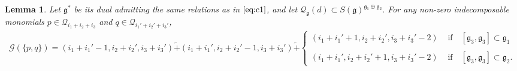 \documentclass[10pt,a4paper]{amsart}
\newtheorem{lemma}{Lemma}
\begin{document}
\begin{lemma}
\label{3.9}
  Let $\mathfrak{g}^*$ be its dual admitting the same relations as in $\eqref{eq:c1}$, and let $\mathcal{Q}_\mathfrak{g}(d) \subset S(\mathfrak{g})^{\mathfrak{g}_1 \oplus \mathfrak{g}_2 }.$ For any non-zero indecomposable monomials $p \in \mathcal{Q}_{i_1 + i_2  + i_3}$ and $q \in \mathcal{Q}_{i_1' + i_2' + i_3'}$,   \begin{align}
  \nonumber
   \mathcal{G} \left(\{p,q\}\right) =     (i_1+i_1'-1,i_2+i_2',i_3+i_3') \tilde{+}(i_1+i_1',i_2+i_2'-1,i_3+i_3') \tilde{+}    \left\{\begin{matrix}
(i_1+i_1'+1,i_2+i_2',i_3+i_3'-2)  & \text{ if } \text{ }  [\mathfrak{g}_3,\mathfrak{g}_3] \subset \mathfrak{g}_1 \\
        \\
         (i_1+i_1',i_2+i_2'+1,i_3+i_3'-2) & \text{ if }  \text{ } [\mathfrak{g}_3,\mathfrak{g}_3] \subset \mathfrak{g}_2.
    \end{matrix}\right.  \\
\end{align} %
 
\end{lemma}
\end{document}

